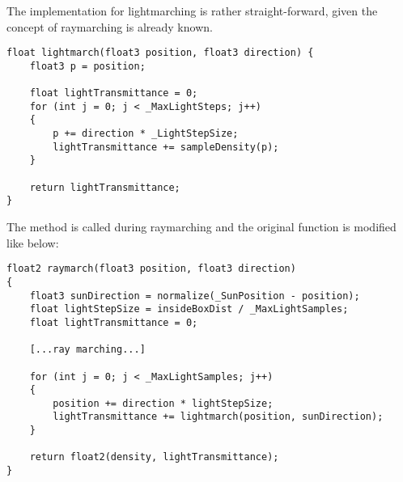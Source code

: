 \begin{figure}[H]
    \label{img:tikz:prototypes:lightmarching2}
\end{figure}

\clearpage
\noindent
The implementation for \gls{lightmarching} is rather straight-forward, given the concept of \gls{raymarching} is already known.

\begin{lstlisting}[language=HLSL, caption=Implementation of lightmarching., label=lst:shader:prototype:lightmarching]
float lightmarch(float3 position, float3 direction) {
    float3 p = position;

    float lightTransmittance = 0;
    for (int j = 0; j < _MaxLightSteps; j++)
    {
        p += direction * _LightStepSize;
        lightTransmittance += sampleDensity(p);
    }

    return lightTransmittance;
}
\end{lstlisting}

\noindent
The method is called during \gls{raymarching} and the original function is modified like below:
\begin{lstlisting}[language=HLSL,caption=Implementation of raymarching with lightmarching., label=lst:shader:prototype:raylightmarching]
float2 raymarch(float3 position, float3 direction)
{
    float3 sunDirection = normalize(_SunPosition - position);
    float lightStepSize = insideBoxDist / _MaxLightSamples;
    float lightTransmittance = 0;

    [...ray marching...]
    
    for (int j = 0; j < _MaxLightSamples; j++)
    {
        position += direction * lightStepSize;
        lightTransmittance += lightmarch(position, sunDirection);
    }

    return float2(density, lightTransmittance);
}
\end{lstlisting}

